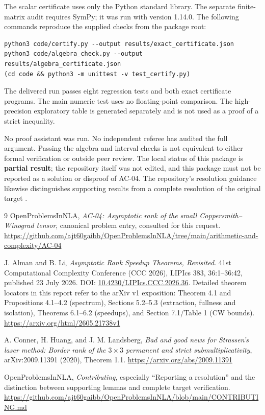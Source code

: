 \documentclass[11pt]{article}
\theoremstyle{definition}\newtheorem{definition}[theorem]{Definition}
\theoremstyle{remark}\newtheorem{remark}[theorem]{Remark}
\begin{document}
The scalar certificate uses only the Python standard library. The separate
finite-matrix audit requires SymPy; it was run with version 1.14.0.
The following commands reproduce the supplied checks from the package root:
\begin{lstlisting}
python3 code/certify.py --output results/exact_certificate.json
python3 code/algebra_check.py --output results/algebra_certificate.json
(cd code && python3 -m unittest -v test_certify.py)
\end{lstlisting}
The delivered run passes eight regression tests and both exact certificate
programs. The main numeric test uses no floating-point comparison. The
high-precision exploratory table is generated separately and is not used as
a proof of a strict inequality.

No proof assistant was run. No independent referee has audited the full
argument. Passing the algebra and interval checks is not equivalent to either
formal verification or outside peer review. The local status of this package
is \textbf{partial result}; the repository itself was not edited, and this
package must not be reported as a solution or disproof of AC-04. The repository's
resolution guidance likewise distinguishes supporting results from a
complete resolution of the original target \cite{contributing}.

\clearpage
\begin{thebibliography}{9}
OpenProblemsInNLA, \emph{AC-04: Asymptotic rank of the small
Coppersmith--Winograd tensor}, canonical problem entry, consulted for this
request.\newline
\url{https://github.com/ajt60gaibb/OpenProblemsInNLA/tree/main/arithmetic-and-complexity/AC-04}

J. Alman and B. Li, \emph{Asymptotic Rank Speedup Theorems, Revisited}.
41st Computational Complexity Conference (CCC 2026), LIPIcs 383,
36:1--36:42, published 23 July 2026.
DOI: \href{https://doi.org/10.4230/LIPIcs.CCC.2026.36}{10.4230/LIPIcs.CCC.2026.36}.
Detailed theorem locators in this report refer to the arXiv v1 exposition:
Theorem 4.1 and Propositions 4.1--4.2 (spectrum),
Sections 5.2--5.3 (extraction, fullness and isolation),
Theorems 6.1--6.2 (speedups), and Section 7.1/Table 1 (CW bounds).\newline
\url{https://arxiv.org/html/2605.21738v1}

A. Conner, H. Huang, and J. M. Landsberg,
\emph{Bad and good news for Strassen's laser method: Border rank of the
$3\times3$ permanent and strict submultiplicativity},
arXiv:2009.11391 (2020), Theorem 1.1.\newline
\url{https://arxiv.org/abs/2009.11391}

OpenProblemsInNLA, \emph{Contributing}, especially ``Reporting a resolution''
and the distinction between supporting lemmas and complete target verification.\newline
\url{https://github.com/ajt60gaibb/OpenProblemsInNLA/blob/main/CONTRIBUTING.md}
\end{thebibliography}
\end{document}
